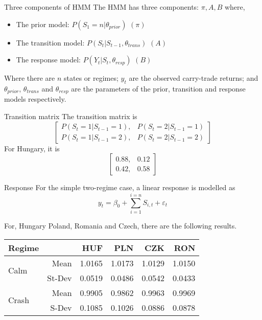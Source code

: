 \documentclass[14pt,xcolor=pdftex,dvipsnames,table]{beamer}
\begin{document}
\begin{frame}{Three components of HMM}
The HMM has three components: $\pi, A, B$ where,
\begin{itemize}[<+-| alert@+>]
\pause
\item The prior model: $P(S_1 = n| \theta_{prior})$ $(\pi)$
\item The transition model: $P(S_t| S_{t-1}, \theta_{trans})$ $(A)$
\item The response model: $P(Y_t| S_t, \theta_{resp})$ $(B)$
\end{itemize}
\pause
Where there are $n$ states or regimes; $y_t$ are the observed carry-trade returns; and $\theta_{prior}$, $\theta_{trans}$ and  $\theta_{resp}$ are the parameters of the prior, transition and response models respectively.
\end{frame}

\begin{frame}{Transition matrix}
The transition matrix is
\begin{equation*}
\begin{bmatrix}
P(S_t = 1|S_{t-1}=1),  & P(S_t = 2|S_{t-1}=1)\\
P(S_t = 1|S_{t-1}=2),  & P(S_t = 2|S_{t-1}=2)
\end{bmatrix}
\end{equation*}
For Hungary, it is 
\begin{equation*}
\begin{bmatrix}
0.88,  & 0.12\\
0.42,  & 0.58
\end{bmatrix}
\end{equation*}
\end{frame}

\begin{frame}{Response}
For the simple two-regime case, a linear response is modelled as
\begin{equation*}
y_t = \beta_0 + \sum_{i=1}^{i=n}S_{i,t} + \varepsilon_t
\end{equation*}

For, Hungary Poland, Romania and Czech, there are the following results. 
\begin{center}
 \begin{tabular}{lrrrrr}
  \hline
 Regime& & HUF & PLN & CZK & RON \\ 
  \hline
   \multirow{2}{*}[5pt]{Calm}& Mean & 1.0165 & 1.0173 & 1.0129 & 1.0150 \\ 
&St-Dev& 0.0519 & 0.0486 & 0.0542 & 0.0433  \\ 
\hline
\multirow{2}{*}[5pt]{Crash}& Mean & 0.9905 & 0.9862 & 0.9963 & 0.9969  \\ 
 &S-Dev & 0.1085 & 0.1026 & 0.0886 & 0.0878 
\end{tabular}
\end{center}
\end{frame}
\end{document}
